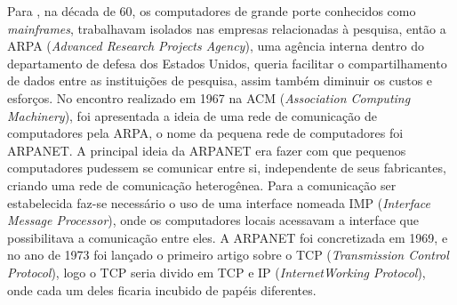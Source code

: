 \par Para , na década de 60, os computadores de
grande porte conhecidos como \textit{mainframes}, trabalhavam isolados nas
empresas relacionadas à pesquisa, então a ARPA (\textit{Advanced Research
Projects Agency}), uma agência interna dentro do departamento de defesa dos
Estados Unidos, queria facilitar o compartilhamento de dados entre as
instituições de pesquisa, assim também diminuir os custos e esforços.
No encontro realizado em 1967 na ACM (\textit{Association Computing
Machinery}), foi apresentada a ideia de uma rede de comunicação de computadores
pela ARPA, o nome da pequena rede de computadores foi ARPANET. A principal ideia
da ARPANET era fazer com que pequenos computadores pudessem se comunicar entre
si, independente de seus fabricantes, criando uma rede de comunicação
heterogênea. Para a comunicação ser estabelecida faz-se necessário o uso de uma
interface nomeada IMP (\textit{Interface Message Processor}), onde os
computadores locais acessavam a interface que possibilitava a
comunicação entre eles. A ARPANET foi concretizada em 1969, e no ano de 1973 foi
lançado o primeiro artigo sobre o TCP (\textit{Transmission Control Protocol}), logo o TCP
seria divido em TCP e IP (\textit{InternetWorking Protocol}), onde cada um deles
ficaria incubido de papéis diferentes.


